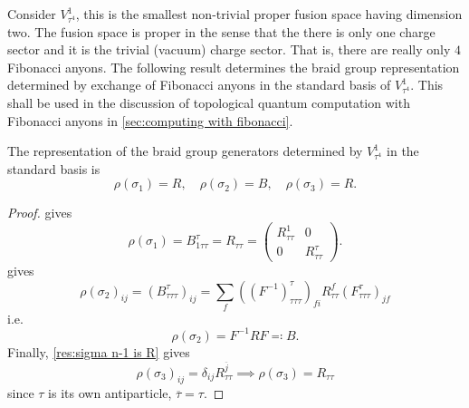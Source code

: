 \begin{example}[Braiding in $V_{τ^4}^1$]
  Consider $V_{τ^4}^1$, this is the smallest non-trivial proper fusion space having dimension two. The fusion space is proper in the sense that the there is only one charge sector and it is the trivial (vacuum) charge sector. That is, there are really only $4$ Fibonacci anyons. The following result determines the braid group representation determined by exchange of Fibonacci anyons in the standard basis of $V_{τ^4}^1$. This shall be used in the discussion of topological quantum computation with Fibonacci anyons in \cref{sec:computing with fibonacci}.

  \begin{proposition}\label{res:fibonacci qubit braiding}
    The representation of the braid group generators determined by $V_{τ^4}^1$ in the standard basis is
    \begin{equation}
      ρ(σ_1) = R,\quad
      ρ(σ_2) = B,\quad
      ρ(σ_3) = R.
    \end{equation}
  \end{proposition}

  \begin{proof}
     gives
    \begin{equation}
      ρ(σ_1) = B_{1ττ}^{τ} = R_{ττ} =
      \begin{pmatrix}
        R_{ττ}^1 & 0 \\
        0 & R_{ττ}^τ
      \end{pmatrix}.
    \end{equation}
     gives
    \begin{equation}
      ρ(σ_2)_{ij} = \left( B^τ_{τττ} \right)_{ij} = \sum_f \left( \left(F^{-1}\right)_{τττ}^τ \right)_{fi} R_{ττ}^f \left( F_{τττ}^τ \right)_{jf}
    \end{equation}
    i.e.
    \begin{equation}
      ρ(σ_2) = F^{-1} R F \eqqcolon B.
    \end{equation}
    Finally, \cref{res:sigma n-1 is R} gives
    \begin{equation}
      ρ(σ_3)_{ij} = \delta_{ij} R_{ττ}^{\overline{j}}
      \implies
      ρ(σ_3) = R_{ττ}
    \end{equation}
    since $τ$ is its own antiparticle, $\overline{τ} = τ$.
  \end{proof}
\end{example}






